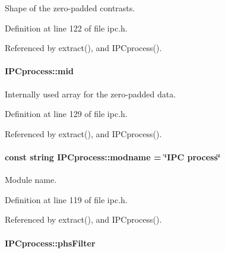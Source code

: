 Shape of the zero-\/padded contrasts. 



Definition at line 122 of file ipc.h.



Referenced by extract(), and IPCprocess().

\hypertarget{classIPCprocess_a14c316de2b5e883defea5c62db959c4a}{
\paragraph[{mid}]{ {\bf IPCprocess::mid}}\hfill}
\label{classIPCprocess_a14c316de2b5e883defea5c62db959c4a}


Internally used array for the zero-\/padded data. 



Definition at line 129 of file ipc.h.



Referenced by extract(), and IPCprocess().

\hypertarget{classIPCprocess_ad63fb78494555bf8dbf32948a8da9759}{
\paragraph[{modname}]{\setlength{\rightskip}{0pt plus 5cm}const string {\bf IPCprocess::modname} = \char`\"{}IPC process\char`\"{}}\hfill}
\label{classIPCprocess_ad63fb78494555bf8dbf32948a8da9759}


Module name. 



Definition at line 119 of file ipc.h.



Referenced by extract(), and IPCprocess().

\hypertarget{classIPCprocess_ad592cdc7e51918d1c5e255981bdd3091}{
\paragraph[{phsFilter}]{ {\bf IPCprocess::phsFilter}}\hfill}
\label{classIPCprocess_ad592cdc7e51918d1c5e255981bdd3091}


